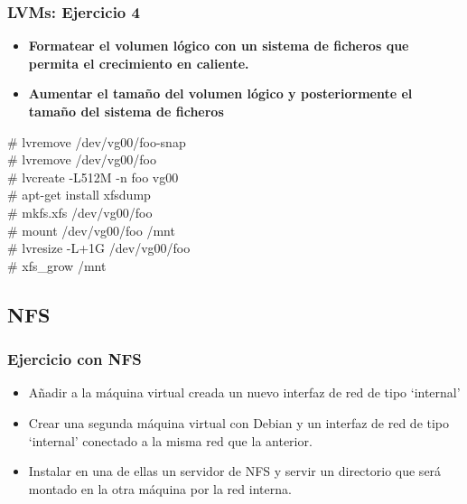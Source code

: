 \documentclass{beamer}
\begin{document}
\begin{frame}
  \frametitle{LVMs: Ejercicio 4}

\begin{itemize}
\item \textbf{Formatear el volumen lógico con un sistema de ficheros que permita el crecimiento en caliente.}
\item \textbf{Aumentar el tamaño del volumen lógico y posteriormente el tamaño del sistema de ficheros}
\end{itemize}

\pause

  \begin{block}{}
\# lvremove /dev/vg00/foo-snap \\
\# lvremove /dev/vg00/foo \\
 
\# lvcreate -L512M -n foo vg00 \\

\# apt-get install xfsdump \\

\# mkfs.xfs /dev/vg00/foo \\
\# mount /dev/vg00/foo /mnt \\

\# lvresize -L+1G /dev/vg00/foo \\

\# xfs\_grow /mnt
  \end{block}

\end{frame}



\subsection{NFS}

\begin{frame}
  \frametitle{Ejercicio con NFS}

  \begin{itemize}
\item Añadir a la máquina virtual creada un nuevo interfaz de red de tipo `internal'
\item Crear una segunda máquina virtual con Debian y un interfaz de red de tipo `internal' conectado a la misma red que la anterior.
\item Instalar en una de ellas un servidor de NFS y servir un directorio que será montado en la otra máquina por la red interna.
  \end{itemize}

\end{frame}










\end{document}
